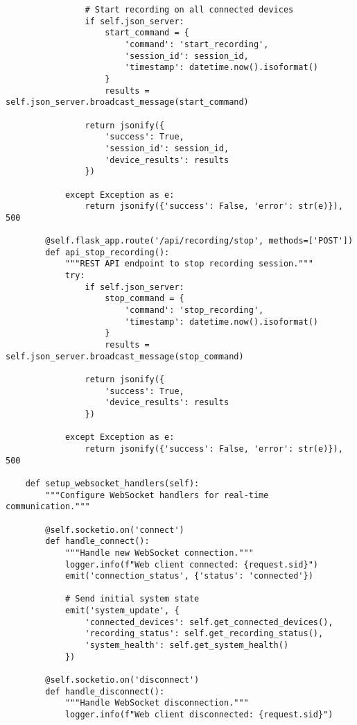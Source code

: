 \documentclass[11pt,a4paper]{article}
\begin{document}
\begin{verbatim}
                # Start recording on all connected devices
                if self.json_server:
                    start_command = {
                        'command': 'start_recording',
                        'session_id': session_id,
                        'timestamp': datetime.now().isoformat()
                    }
                    results = self.json_server.broadcast_message(start_command)

                return jsonify({
                    'success': True,
                    'session_id': session_id,
                    'device_results': results
                })

            except Exception as e:
                return jsonify({'success': False, 'error': str(e)}), 500

        @self.flask_app.route('/api/recording/stop', methods=['POST'])
        def api_stop_recording():
            """REST API endpoint to stop recording session."""
            try:
                if self.json_server:
                    stop_command = {
                        'command': 'stop_recording',
                        'timestamp': datetime.now().isoformat()
                    }
                    results = self.json_server.broadcast_message(stop_command)

                return jsonify({
                    'success': True,
                    'device_results': results
                })

            except Exception as e:
                return jsonify({'success': False, 'error': str(e)}), 500

    def setup_websocket_handlers(self):
        """Configure WebSocket handlers for real-time communication."""

        @self.socketio.on('connect')
        def handle_connect():
            """Handle new WebSocket connection."""
            logger.info(f"Web client connected: {request.sid}")
            emit('connection_status', {'status': 'connected'})

            # Send initial system state
            emit('system_update', {
                'connected_devices': self.get_connected_devices(),
                'recording_status': self.get_recording_status(),
                'system_health': self.get_system_health()
            })

        @self.socketio.on('disconnect')
        def handle_disconnect():
            """Handle WebSocket disconnection."""
            logger.info(f"Web client disconnected: {request.sid}")


\end{verbatim}
\end{document}
